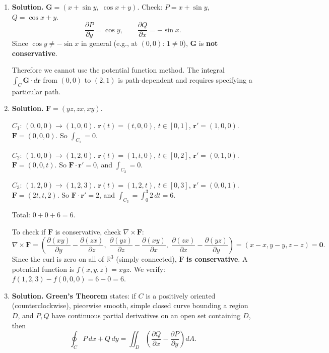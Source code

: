 \begin{enumerate}
Although one can check $\frac{\partial P}{\partial y} = \frac{\partial Q}{\partial x}$ (both equal $\frac{y^2-x^2}{(x^2+y^2)^2}$), the field is \textbf{not conservative} because the domain $\mathbb{R}^2\setminus\{(0,0)\}$ is \emph{not simply connected}. The circulation around the origin is $2\pi \neq 0$, which is impossible for a conservative field.

\item \textbf{Solution.}
$\mathbf{G}=(x+\sin y,\;\cos x + y)$. Check: $P = x+\sin y$, $Q = \cos x + y$.
\[
\frac{\partial P}{\partial y} = \cos y, \qquad \frac{\partial Q}{\partial x} = -\sin x.
\]
Since $\cos y \neq -\sin x$ in general (e.g., at $(0,0)$: $1\neq 0$), $\mathbf{G}$ is \textbf{not conservative}.

Therefore we cannot use the potential function method. The integral $\int_C \mathbf{G}\cdot d\mathbf{r}$ from $(0,0)$ to $(2,1)$ is path-dependent and requires specifying a particular path.

\item \textbf{Solution.}
$\mathbf{F} = (yz, zx, xy)$.

\textbf{$C_1$}: $(0,0,0)\to(1,0,0)$. $\mathbf{r}(t)=(t,0,0)$, $t\in[0,1]$, $\mathbf{r}'=(1,0,0)$.
$\mathbf{F}=(0,0,0)$. So $\int_{C_1}=0$.

\textbf{$C_2$}: $(1,0,0)\to(1,2,0)$. $\mathbf{r}(t)=(1,t,0)$, $t\in[0,2]$, $\mathbf{r}'=(0,1,0)$.
$\mathbf{F}=(0,0,t)$. So $\mathbf{F}\cdot\mathbf{r}' = 0$, and $\int_{C_2}=0$.

\textbf{$C_3$}: $(1,2,0)\to(1,2,3)$. $\mathbf{r}(t)=(1,2,t)$, $t\in[0,3]$, $\mathbf{r}'=(0,0,1)$.
$\mathbf{F}=(2t, t, 2)$. So $\mathbf{F}\cdot\mathbf{r}' = 2$, and $\int_{C_3} = \int_0^3 2\,dt = 6$.

Total: $0+0+6 = \boxed{6}$.

To check if $\mathbf{F}$ is conservative, check $\nabla\times\mathbf{F}$:
\[
\nabla\times\mathbf{F} = \left(\frac{\partial(xy)}{\partial y}-\frac{\partial(zx)}{\partial z},\;\frac{\partial(yz)}{\partial z}-\frac{\partial(xy)}{\partial x},\;\frac{\partial(zx)}{\partial x}-\frac{\partial(yz)}{\partial y}\right) = (x-x, y-y, z-z) = \mathbf{0}.
\]
Since the curl is zero on all of $\mathbb{R}^3$ (simply connected), $\mathbf{F}$ \textbf{is conservative}. A potential function is $f(x,y,z)=xyz$. We verify: $f(1,2,3)-f(0,0,0)=6-0=6$.

\item \textbf{Solution.}
\textbf{Green's Theorem} states: if $C$ is a positively oriented (counterclockwise), piecewise smooth, simple closed curve bounding a region $D$, and $P,Q$ have continuous partial derivatives on an open set containing $D$, then
\[
\oint_C P\,dx + Q\,dy = \iint_D \left(\frac{\partial Q}{\partial x} - \frac{\partial P}{\partial y}\right)dA.
\]


\end{enumerate}
